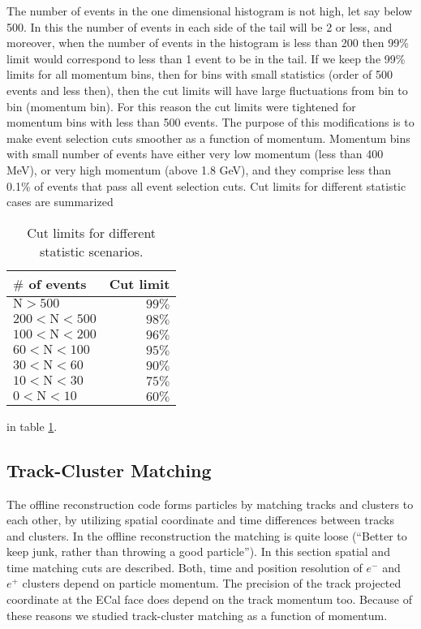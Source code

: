 \documentclass[letterpaper,12pt]{article}
\begin{document}
\vskip 1cm
The number of events in the one dimensional histogram is not high, let say below 
500. In this the number of events in each side of the tail will be 2 or less, and 
moreover, when the number of events in the histogram is less than 200 then 99\%
limit would correspond to less than 1 event to be in the tail. If we keep the 99\%
limits for all momentum bins, then for bins with small statistics 
(order of 500 events and less then), then the cut limits will have large
fluctuations from bin to bin (momentum bin). For this reason the cut limits
were tightened for momentum bins with less than 500 events. The purpose of this
modifications is to make event selection cuts smoother as a function of momentum.
Momentum bins with small number of events have either very low momentum 
(less than 400 MeV), or very high momentum (above 1.8 GeV), and they comprise
less than 0.1\% of events that pass all event selection cuts.
Cut limits for different statistic cases are summarized
\begin{table}[!htb]
 \centering
 \begin{tabular}{|l|r|}
  \hline
 \textbf{ $\#$ of events} & \textbf{Cut limit} \\ \hline
  $\mathrm{ N > 500}$ & $99\%$ \\ \hline
  $\mathrm{200 < N < 500}$ & $98\%$ \\ \hline
  $\mathrm{100 < N < 200}$ & $96\%$ \\ \hline
  $\mathrm{60 < N < 100}$ & $95\%$ \\ \hline
  $\mathrm{30 < N < 60}$ & $90\%$ \\ \hline
  $\mathrm{10 < N < 30}$ & $75\%$ \\ \hline
  $\mathrm{0  < N < 10}$ & $60\%$ \\ \hline
 \end{tabular}
\caption{Cut limits for different statistic scenarios.}
\label{tb:2DCutLimits}
\end{table}
in table \ref{tb:2DCutLimits}.

\subsection{Track-Cluster Matching}
The offline reconstruction code forms particles by matching tracks and clusters to each other, by utilizing spatial coordinate and time differences between tracks and clusters.
In the offline reconstruction the matching is quite loose (``Better to keep junk, rather than throwing a good particle''). In this section spatial and time matching cuts are described. Both, time and position resolution of $e^{-}$ and $e^{+}$ clusters depend on particle momentum. The precision of the track projected coordinate at the ECal face does depend on the track momentum too. Because of these reasons we studied track-cluster matching as a function of momentum.
\end{document}
